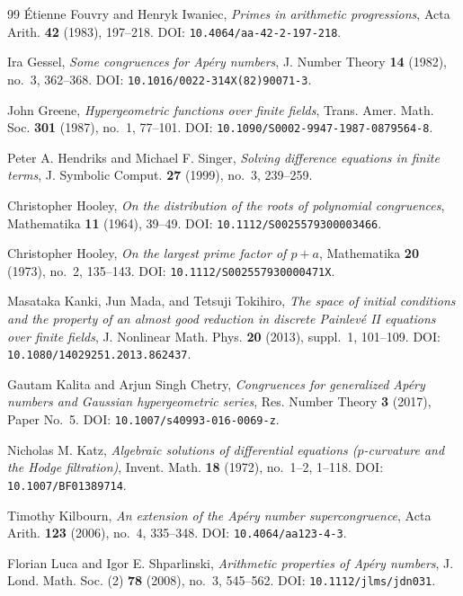 \documentclass[11pt]{amsart}
\theoremstyle{plain}
\theoremstyle{remark}
\begin{document}
\begin{thebibliography}{99}
\'Etienne Fouvry and Henryk Iwaniec,
\emph{Primes in arithmetic progressions},
Acta Arith. \textbf{42} (1983), 197--218.
DOI: \texttt{10.4064/aa-42-2-197-218}.

Ira Gessel,
\emph{Some congruences for Ap\'ery numbers},
J. Number Theory \textbf{14} (1982), no.~3, 362--368.
DOI: \texttt{10.1016/0022-314X(82)90071-3}.

John Greene,
\emph{Hypergeometric functions over finite fields},
Trans. Amer. Math. Soc. \textbf{301} (1987), no.~1, 77--101.
DOI: \texttt{10.1090/S0002-9947-1987-0879564-8}.

Peter A. Hendriks and Michael F. Singer,
\emph{Solving difference equations in finite terms},
J. Symbolic Comput. \textbf{27} (1999), no.~3, 239--259.

Christopher Hooley,
\emph{On the distribution of the roots of polynomial congruences},
Mathematika \textbf{11} (1964), 39--49.
DOI: \texttt{10.1112/S0025579300003466}.

Christopher Hooley,
\emph{On the largest prime factor of $p+a$},
Mathematika \textbf{20} (1973), no.~2, 135--143.
DOI: \texttt{10.1112/S002557930000471X}.

Masataka Kanki, Jun Mada, and Tetsuji Tokihiro,
\emph{The space of initial conditions and the property of an almost
good reduction in discrete Painlev\'e II equations over finite fields},
J. Nonlinear Math. Phys. \textbf{20} (2013), suppl.~1, 101--109.
DOI: \texttt{10.1080/14029251.2013.862437}.

Gautam Kalita and Arjun Singh Chetry,
\emph{Congruences for generalized Ap\'ery numbers and Gaussian
hypergeometric series},
Res. Number Theory \textbf{3} (2017), Paper No.~5.
DOI: \texttt{10.1007/s40993-016-0069-z}.

Nicholas M. Katz,
\emph{Algebraic solutions of differential equations
($p$-curvature and the Hodge filtration)},
Invent. Math. \textbf{18} (1972), no.~1--2, 1--118.
DOI: \texttt{10.1007/BF01389714}.

Timothy Kilbourn,
\emph{An extension of the Ap\'ery number supercongruence},
Acta Arith. \textbf{123} (2006), no.~4, 335--348.
DOI: \texttt{10.4064/aa123-4-3}.

Florian Luca and Igor E. Shparlinski,
\emph{Arithmetic properties of Ap\'ery numbers},
J. Lond. Math. Soc. (2) \textbf{78} (2008), no.~3, 545--562.
DOI: \texttt{10.1112/jlms/jdn031}.


\end{thebibliography}
\end{document}
